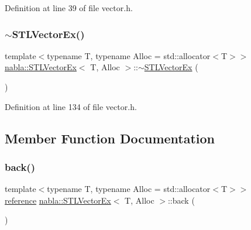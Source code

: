 Definition at line 39 of file vector.\+h.

\mbox{\label{classnabla_1_1_s_t_l_vector_ex_a95dda91687a64854458b42a58c011f91}} 
\subsubsection{\texorpdfstring{$\sim$STLVectorEx()}{~STLVectorEx()}}
{\footnotesize\ttfamily template$<$typename T, typename Alloc = std\+::allocator$<$\+T$>$$>$ \\
\mbox{\hyperlink{classnabla_1_1_s_t_l_vector_ex}{nabla\+::\+S\+T\+L\+Vector\+Ex}}$<$ T, Alloc $>$\+::$\sim$\mbox{\hyperlink{classnabla_1_1_s_t_l_vector_ex}{S\+T\+L\+Vector\+Ex}} (\begin{DoxyParamCaption}{ }\end{DoxyParamCaption})\hspace{0.3cm}{\ttfamily [inline]}}



Definition at line 134 of file vector.\+h.



\subsection{Member Function Documentation}
\mbox{\label{classnabla_1_1_s_t_l_vector_ex_a4fd7e56ad9f737416be66a7556052fc7}} 
\subsubsection{\texorpdfstring{back()}{back()}}
{\footnotesize\ttfamily template$<$typename T, typename Alloc = std\+::allocator$<$\+T$>$$>$ \\
\mbox{\hyperlink{classnabla_1_1_s_t_l_vector_ex_a6adf5d87234352c139af2d48f4787ed5}{reference}} \mbox{\hyperlink{classnabla_1_1_s_t_l_vector_ex}{nabla\+::\+S\+T\+L\+Vector\+Ex}}$<$ T, Alloc $>$\+::back (\begin{DoxyParamCaption}{ }\end{DoxyParamCaption})\hspace{0.3cm}{\ttfamily [inline]}}




